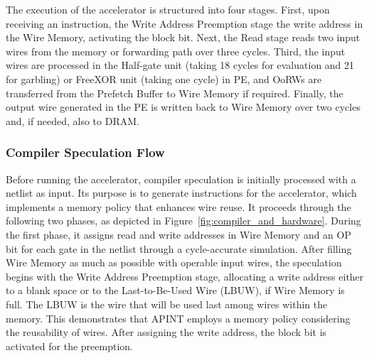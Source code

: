 The execution of the accelerator is structured into four stages. First, upon receiving an instruction, the Write Address Preemption stage the write address in the Wire Memory, activating the block bit. Next, the Read stage reads two input wires from the memory or forwarding path over three cycles. Third, the input wires are processed in the Half-gate unit (taking 18 cycles for evaluation and 21 for garbling) or FreeXOR unit (taking one cycle) in PE, and OoRWs are transferred from the Prefetch Buffer to Wire Memory if required. Finally, the output wire generated in the PE is written back to Wire Memory over two cycles and, if needed, also to DRAM.


\subsubsection{\textbf{Compiler Speculation Flow}}
Before running the accelerator, compiler speculation is initially processed with a netlist as input. Its purpose is to generate instructions for the accelerator, which implements a memory policy that enhances wire reuse. It proceeds through the following two phases, as depicted in Figure~\ref{fig:compiler_and_hardware}. During the first phase, it assigns read and write addresses in Wire Memory and an OP bit for each gate in the netlist through a cycle-accurate simulation. After filling Wire Memory as much as possible with operable input wires, the speculation begins with the Write Address Preemption stage, allocating a write address either to a blank space or to the Last-to-Be-Used Wire (LBUW), if Wire Memory is full. The LBUW is the wire that will be used last among wires within the memory. This demonstrates that APINT employs a memory policy considering the reusability of wires. After assigning the write address, the block bit is activated for the preemption.


